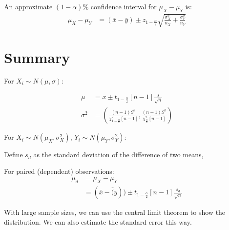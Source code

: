                 An approximate $(1 - \alpha)\%$ confidence interval for $\mu_X - \mu_Y$ is:
                \begin{align*}
                    \mu_X - \mu_Y &= (\bar{x} - \bar{y}) \pm z_{1 - \frac{\alpha}{2}} \sqrt{\frac{\sigma_X^2}{n_X} + \frac{\sigma_Y^2}{n_Y}}
                \end{align*}
            \section{Summary} %
            \label{sec:summary}
                For $X_i \sim N(\mu, \sigma)$:

                \begin{align*}
                    \mu &= \bar{x} \pm t_{1 - \frac{\alpha}{2}} [n-1] \frac{s}{\sqrt{n}} \\
                    \sigma^2 &=
                        \left(
                            \frac{(n-1)S^2}{\chi_{1-\frac{\alpha}{2}}^2 [n - 1]},
                            \frac{(n-1)S^2}{\chi_{\frac{\alpha}{2}}^2 [n - 1]}
                        \right)
                \end{align*}

                For $X_i \sim N(\mu_X, \sigma^2_X)$, $Y_i \sim N(\mu_Y, \sigma^2_Y)$:

                Define $s_d$ as the standard deviation of the difference of two means,

                For paired (dependent) observations:
                \begin{align*}
                    \mu_d &= \mu_X - \mu_Y \\
                    &= (\bar{x} - \bar(y)) \pm t_{1 - \frac{\alpha}{2}} [n - 1] \frac{s_d}{\sqrt{n}}
                \end{align*}

                With large sample sizes, we can use the central limit theorem to show the distribution.
                We can also estimate the standard error this way.

